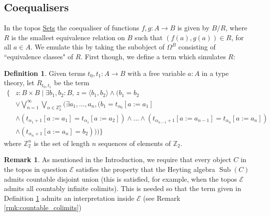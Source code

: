\documentclass{birkjour}
\theoremstyle{plain}
\theoremstyle{definition}
\newtheorem{definition}[thm]{Definition} %
\newtheorem{remark}[thm]{Remark}
\newcommand{\bb}[1]{\mathbb{#1}}
\newcommand{\call}[1]{\mathcal{#1}}
\begin{document}
	\subsection{Coequalisers}
	\label{sec:coequaliser}
	In the topos \underline{Sets} the coequaliser of functions $f,g: A \to B$ is given by $B/R$, where $R$ is the smallest equivalence relation on $B$ such that $(f(a), g(a)) \in R$, for all $a \in A$. We emulate this by taking the subobject of $\Omega^B$ consisting of ``equivalence classes" of $R$. First though, we define a term which simulates $R$:
	\begin{definition}
		\label{def:relation}
		Given terms $t_0,t_1: A \to B$ with a free variable $a:A$ in a type theory, let $R_{t_0,t_1}$ be the term
		\begin{align*}
			\Big\lbrace &z: B \times B \mid \exists b_1, b_2 : B\text{, }z = \langle b_1, b_2 \rangle \wedge \Big(b_1 = b_2\\
			&\vee \bigvee_{n = 1}^\infty\bigvee_{\alpha \in \bb{Z}_2^n}\big( \exists a_1,...,a_n, (b_1 = t_{\alpha_0}[a:= a_1]\\
			&\wedge (t_{\alpha_1 + 1}[a:= a_1] = t_{\alpha_1}[a:= a_2]) \wedge ... \wedge (t_{\alpha_{n-1}+1}[a:= a_{n-1}] = t_{\alpha_{n}}[a:= a_n])\\
			&\wedge (t_{\alpha_{n}+1}[a:= a_n] = b_2)\big)\Big)\Big\rbrace
		\end{align*}
		where $\mathbb{Z}_2^n$ is the set of length $n$ sequences of elements of $\mathbb{Z}_{2}$. 
	\end{definition}
	\begin{remark}
		As mentioned in the Introduction, we require that every object $C$ in the topos in question $\call{E}$ satisfies the property that the Heyting algebra $\operatorname{Sub}(C)$ admits countable disjoint union (this is satisfied, for example, when the topos $\call{E}$ admits all countably infinite colimits). This is needed so that the term given in Definition \ref{def:relation} admits an interpretation inside $\call{E}$ (see Remark \ref{rmk:countable_colimits})
	\end{remark}
	
\end{document}
